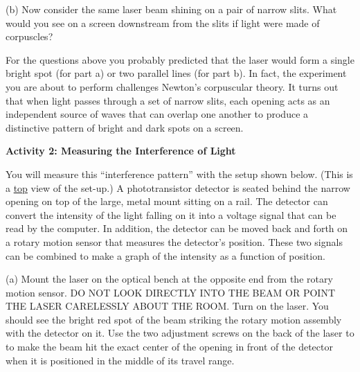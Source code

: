 (b) Now consider the same laser beam shining on a pair of narrow slits.
What would you see on a screen downstream from the slits if light
were made of corpuscles?
\answerspace{35mm}

\pagebreak[2]
For the questions above you probably predicted that the laser would
form a single bright spot (for part a) or two parallel lines (for part
b).  In fact, the experiment you are about to perform challenges Newton's corpuscular theory. 
It turns out that when light passes through a set of narrow slits, each opening acts as an independent
source of waves that can overlap one another to produce a distinctive
pattern of bright and dark spots on a screen. 

\textbf{Activity 2: Measuring the Interference of Light }

You will measure this ``interference pattern'' with the setup shown below. 
(This is a \underline{top} view of the set-up.) 
A phototransistor detector is seated behind the narrow opening on top of the large,
metal mount sitting on a rail. The detector can convert the intensity 
of the light falling on it into a voltage signal that can be read by the
computer. In addition, the detector can be moved back and
forth on a rotary motion sensor that measures the detector's position. These two signals can be combined to
make a graph of the intensity as a function of position.

\vspace{0.3cm}
{\centering {} \par}
\vspace{0.3cm}

(a) Mount the laser on the 
optical bench at the opposite end from the rotary motion sensor.
DO NOT LOOK DIRECTLY INTO
THE BEAM OR POINT THE LASER CARELESSLY ABOUT THE ROOM.  Turn on the
laser.  You should see the bright red spot of the beam striking
the rotary motion assembly with the detector on it. 
Use the two adjustment screws on the back of the laser to to make the beam hit the exact center of the opening in front of the detector when it is positioned in the middle of its travel range.  

